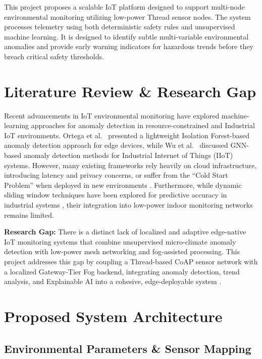 \documentclass[10pt,a4paper]{article}
\begin{document}
This project proposes a scalable IoT platform designed to support multi-node
environmental monitoring utilizing low-power Thread sensor nodes. The system processes
telemetry using both deterministic safety rules and unsupervised machine learning. It
is designed to identify subtle multi-variable environmental anomalies and provide early
warning indicators for hazardous trends before they breach critical safety thresholds.

\section{Literature Review \& Research Gap}

Recent advancements in IoT environmental monitoring have explored machine-learning
approaches for anomaly detection in resource-constrained and Industrial IoT environments.
Ortega et al.\ \cite{ortega2025} presented a lightweight Isolation Forest-based anomaly
detection approach for edge devices, while Wu et al.\ \cite{wu2022} discussed GNN-based
anomaly detection methods for Industrial Internet of Things (IIoT) systems. However,
many existing frameworks rely heavily on cloud infrastructure, introducing latency and
privacy concerns, or suffer from the ``Cold Start Problem'' when deployed in new
environments \cite{chhabra2025}. Furthermore, while dynamic sliding window techniques
have been explored for predictive accuracy in industrial systems \cite{guha2025}, their
integration into low-power indoor monitoring networks remains limited.

\textbf{Research Gap:} There is a distinct lack of localized and adaptive edge-native
IoT monitoring systems that combine unsupervised micro-climate anomaly detection with
low-power mesh networking and fog-assisted processing. This project addresses this gap
by coupling a Thread-based CoAP sensor network with a localized Gateway-Tier Fog
backend, integrating anomaly detection, trend analysis, and Explainable AI into a
cohesive, edge-deployable system \cite{chaturvedi2026}.

\section{Proposed System Architecture}

\subsection{Environmental Parameters \& Sensor Mapping}
\end{document}
